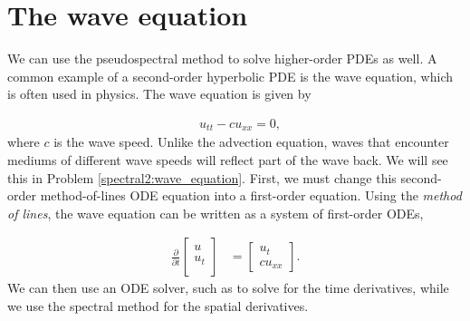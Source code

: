\section*{The wave equation}
We can use the pseudospectral method to solve higher-order PDEs as well. A common example of a second-order hyperbolic PDE is the wave equation, which is often used in physics. The wave equation is given by

\begin{align*}
&{ }u_{tt} - cu_{xx} = 0,
\end{align*}
where $c$ is the wave speed. Unlike the advection equation, waves that encounter mediums of different wave speeds will reflect part of the wave back. We will see this in Problem \ref{spectral2:wave_equation}. First, we must change this second-order method-of-lines ODE equation into a first-order equation.
Using the \textit{method of lines}, the wave equation can be written as a system of first-order ODEs,

\begin{align}
\frac{\partial}{\partial t} \begin{bmatrix}
u\\
u_t \\
\end{bmatrix} &=
\begin{bmatrix}
u_t\\
cu_{xx}
\end{bmatrix}.
\end{align}
We can then use an ODE solver, such as  to solve for the time derivatives, while we use the spectral method for the spatial derivatives.

